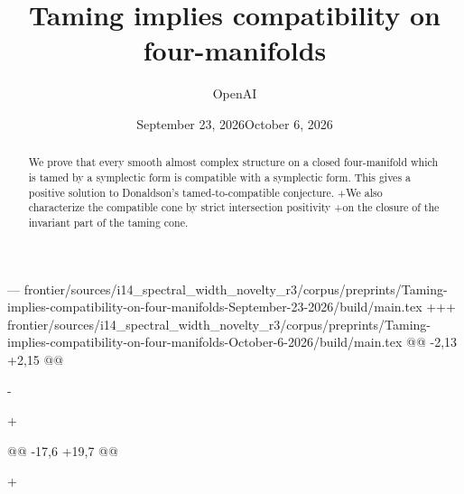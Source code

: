 --- frontier/sources/i14_spectral_width_novelty_r3/corpus/preprints/Taming-implies-compatibility-on-four-manifolds-September-23-2026/build/main.tex
+++ frontier/sources/i14_spectral_width_novelty_r3/corpus/preprints/Taming-implies-compatibility-on-four-manifolds-October-6-2026/build/main.tex
@@ -2,13 +2,15 @@
 
 \title{Taming implies compatibility on four-manifolds}
 \author{OpenAI}
-\date{September 23, 2026}
+\date{October 6, 2026}
 
 \maketitle
 \begin{abstract}
 We prove that every smooth almost complex structure on a closed four-manifold
 which is tamed by a symplectic form is compatible with a symplectic form.
 This gives a positive solution to Donaldson's tamed-to-compatible conjecture.
+We also characterize the compatible cone by strict intersection positivity
+on the closure of the invariant part of the taming cone.
 \end{abstract}
 
 
@@ -17,6 +19,7 @@
 
 
 
+
 \begingroup
 \small
 
